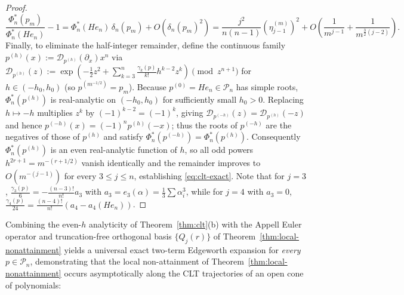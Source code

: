 \documentclass[11pt,a4paper]{article}
\theoremstyle{definition}
\begin{document}
\begin{proof}
\[
\frac{\Phi_n^*(p_m)}{\Phi_n^*(He_n)} - 1 = \Phi_n^*(He_n)\, \delta_n(p_m) + O\!\left(\delta_n(p_m)^2\right) = \frac{j^2}{n(n-1)} (\eta^{(m)}_{j-1})^2 + O\!\left(\frac{1}{m^{j-1}} + \frac{1}{m^{\frac{3}{2}(j-2)}}\right).
\]
Finally, to eliminate the half-integer remainder, define the continuous family $p^{(h)}(x) := \mathcal{D}_{p^{(h)}}(\partial_x) x^n$ via $\mathcal{D}_{p^{(h)}}(z) := \exp(-\frac{1}{2}z^2 + \sum_{k=3}^n \frac{\gamma_k(p)}{k!} h^{k-2} z^k) \pmod{z^{n+1}}$ for $h \in (-h_0, h_0)$ (so $p^{(m^{-1/2})} = p_m$). Because $p^{(0)} = He_n \in \mathcal{P}_n$ has simple roots, $\Phi_n^*(p^{(h)})$ is real-analytic on $(-h_0, h_0)$ for sufficiently small $h_0 > 0$. Replacing $h \mapsto -h$ multiplies $z^k$ by $(-1)^{k-2} = (-1)^k$, giving $\mathcal{D}_{p^{(-h)}}(z) = \mathcal{D}_{p^{(h)}}(-z)$ and hence $p^{(-h)}(x) = (-1)^n p^{(h)}(-x)$; thus the roots of $p^{(-h)}$ are the negatives of those of $p^{(h)}$ and satisfy $\Phi_n^*(p^{(-h)}) = \Phi_n^*(p^{(h)})$. Consequently $\Phi_n^*(p^{(h)})$ is an even real-analytic function of $h$, so all odd powers $h^{2r+1} = m^{-(r+1/2)}$ vanish identically and the remainder improves to $O(m^{-(j-1)})$ for every $3 \le j \le n$, establishing \eqref{eq:clt-exact}. Note that for $j=3$, $\frac{\gamma_3(p)}{6} = -\frac{(n-3)!}{n!}a_3$ with $a_3 = e_3(\alpha) = \frac{1}{3}\sum \alpha_i^3$, while for $j=4$ with $a_3 = 0$, $\frac{\gamma_4(p)}{24} = \frac{(n-4)!}{n!}(a_4 - a_4(He_n))$.
\end{proof}

Combining the even-$h$ analyticity of Theorem~\ref{thm:clt}(b) with the Appell Euler operator and truncation-free orthogonal basis $\{Q_j(r)\}$ of Theorem~\ref{thm:local-nonattainment} yields a universal exact two-term Edgeworth expansion for \emph{every} $p \in \mathcal{P}_n$, demonstrating that the local non-attainment of Theorem~\ref{thm:local-nonattainment} occurs asymptotically along the CLT trajectories of an open cone of polynomials:
\end{document}
